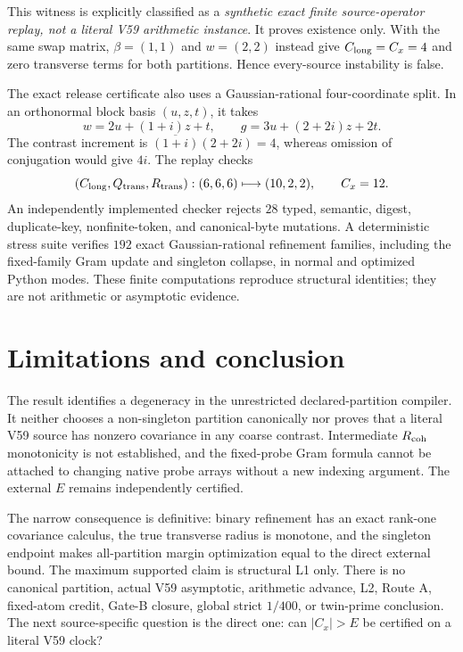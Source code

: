 \documentclass[10pt]{article}
\newcommand{\conj}[1]{\overline{#1}}
\begin{document}
This witness is explicitly classified as a
\emph{synthetic exact finite source-operator replay, not a literal V59
arithmetic instance}.  It proves existence only.  With the same swap matrix,
$\beta=(1,1)$ and $w=(2,2)$ instead give $C_{\rm long}=C_x=4$ and zero
transverse terms for both partitions.  Hence every-source instability is
false.

The exact release certificate also uses a Gaussian-rational four-coordinate
split.  In an orthonormal block basis $(u,z,t)$, it takes
\[
 w=2u+(1+i)z+t,\qquad g=3u+(2+2i)z+2t.
\]
The contrast increment is
$\conj{(1+i)}(2+2i)=4$, whereas omission of conjugation would give $4i$.
The replay checks
\[
 (C_{\rm long},Q_{\rm trans},R_{\rm trans}):
 (6,6,6)\longmapsto(10,2,2),\qquad C_x=12.
\]
An independently implemented checker rejects $28$ typed, semantic, digest,
duplicate-key, nonfinite-token, and canonical-byte mutations.  A deterministic
stress suite verifies $192$ exact Gaussian-rational refinement families,
including the fixed-family Gram update and singleton collapse, in normal and
optimized Python modes.  These finite computations reproduce structural
identities; they are not arithmetic or asymptotic evidence.

\section{Limitations and conclusion}

The result identifies a degeneracy in the unrestricted declared-partition
compiler.  It neither chooses a non-singleton partition canonically nor proves
that a literal V59 source has nonzero covariance in any coarse contrast.
Intermediate $R_{\rm coh}$ monotonicity is not established, and the fixed-probe
Gram formula cannot be attached to changing native probe arrays without a new
indexing argument.  The external $E$ remains independently certified.

The narrow consequence is definitive: binary refinement has an exact
rank-one covariance calculus, the true transverse radius is monotone, and the
singleton endpoint makes all-partition margin optimization equal to the
direct external bound.  The maximum supported claim is structural L1 only.
There is no canonical partition, actual V59 asymptotic, arithmetic advance,
L2, Route A, fixed-atom credit, Gate-B closure, global strict $1/400$, or
twin-prime conclusion.  The next source-specific question is the direct one:
can $|C_x|>E$ be certified on a literal V59 clock?



\end{document}
